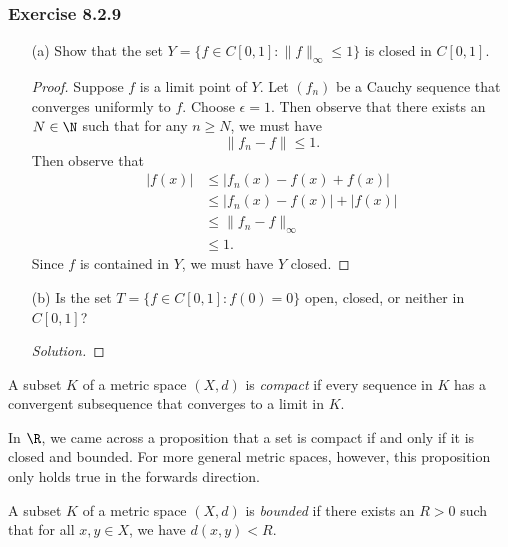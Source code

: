 \subsubsection{Exercise 8.2.9} 
\begin{enumerate}
    \item[(a)] Show that the set \( Y = \{ f \in C[0,1] :  \lVert f \rVert_{\infty } \leq 1  \}  \) is closed in \( C[0,1] \).
        \begin{proof}
        Suppose \( f  \) is a limit point of \( Y  \). Let \( (f_{n}) \) be a Cauchy sequence that converges uniformly to \( f  \). Choose \( \epsilon  =1  \). Then observe that there exists an \( N \in \N  \) such that for any \( n \geq N  \), we must have 
        \[ \lVert f_{n} - f  \rVert \leq 1. \] Then observe that 
        \begin{align*}
            | f(x) | &\leq | f_{n}(x) - f(x) + f(x)  |  \\
                  &\leq | f_{n}(x) - f(x)  | + | f(x)  | \\
                  &\leq \lVert f_{n} - f  \rVert_{\infty } \\
                  &\leq 1.
        \end{align*}
        Since \( f  \) is contained in \( Y  \), we must have \( Y  \) closed.
        \end{proof}
    \item[(b)] Is the set \( T = \{ f \in C[0,1] : f(0) = 0  \}  \) open, closed, or neither in \( C[0,1] \)? 
        \begin{proof}[Solution]
        
        \end{proof}
\end{enumerate}



\begin{tcolorbox}
\begin{defn}
A subset \( K  \) of a metric space \( (X,d)  \) is \textit{compact} if every sequence in \( K  \) has a convergent subsequence that converges to a limit in \( K  \).
\end{defn}
\end{tcolorbox}

In \( \R  \), we came across a proposition that a set is compact if and only if it is closed and bounded. For more general metric spaces, however, this proposition only holds true in the forwards direction.

\begin{tcolorbox}
\begin{defn}
A subset \( K \) of a metric space \( (X,d)  \) is \textit{bounded} if there exists an \( R > 0  \) such that for all \( x,y \in X  \), we have \( d(x,y) < R  \).
\end{defn}
\end{tcolorbox}


